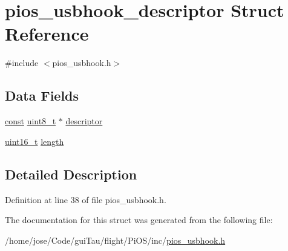 \hypertarget{structpios__usbhook__descriptor}{\section{pios\-\_\-usbhook\-\_\-descriptor Struct Reference}
\label{structpios__usbhook__descriptor}
}


{\ttfamily \#include $<$pios\-\_\-usbhook.\-h$>$}

\subsection*{Data Fields}
\begin{DoxyCompactItemize}
\item 
\hyperlink{group___n_a_m_e_ga7ae6d0e43244213b34de2c2b9aa30da6}{const} \hyperlink{stdint_8h_aba7bc1797add20fe3efdf37ced1182c5}{uint8\-\_\-t} $\ast$ \hyperlink{group___p_i_o_s___u_s_b_h_o_o_k_ga56ff6e20a77e4421c8c47442ca13d75b}{descriptor}
\item 
\hyperlink{stdint_8h_a273cf69d639a59973b6019625df33e30}{uint16\-\_\-t} \hyperlink{group___p_i_o_s___u_s_b_h_o_o_k_ga9cc49b35b49236ac74e747d179a3650f}{length}
\end{DoxyCompactItemize}


\subsection{Detailed Description}


Definition at line 38 of file pios\-\_\-usbhook.\-h.



The documentation for this struct was generated from the following file\-:\begin{DoxyCompactItemize}
\item 
/home/jose/\-Code/gui\-Tau/flight/\-Pi\-O\-S/inc/\hyperlink{pios__usbhook_8h}{pios\-\_\-usbhook.\-h}\end{DoxyCompactItemize}
